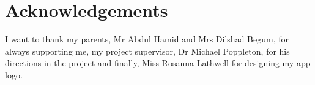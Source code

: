 \chapter*{Acknowledgements}
I want to thank my parents, Mr Abdul Hamid and Mrs Dilshad Begum, for always supporting me, my project supervisor, Dr Michael Poppleton, for his directions in the project and finally, Miss Rosanna Lathwell for designing my app logo.